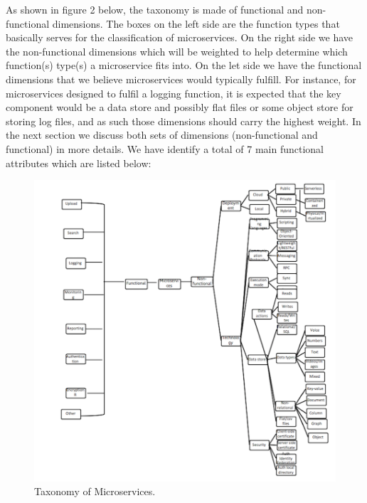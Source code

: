 \documentclass{article}
\begin{document}
As shown in figure 2 below, the taxonomy is made of functional and non-functional dimensions. The boxes on the left side are the function types that basically serves for the classification of microservices. On the right side we have the non-functional dimensions which will be weighted to help determine which function(s) type(s) a microservice fits into. On the let side we have the functional dimensions that we believe microservices would typically fulfill. For instance, for microservices designed to fulfil a logging function, it is expected that the key component would be a data store and possibly flat files or some object store for storing log files, and as such those dimensions should carry the highest weight. In the next section we discuss both sets of dimensions (non-functional and functional) in more details. We have identify a total of 7 main functional attributes which are listed below:

\begin{figure}[h!]
\includegraphics{taxonomydiagram.png}
\caption{Taxonomy of Microservices.}
\end{figure}
\end{document}
